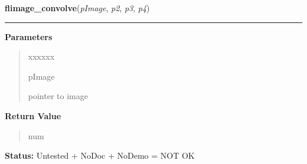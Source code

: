     \label{xformslib:library:flimage_convolve}

    \vspace{0.5ex}

\hspace{.8\funcindent}\begin{boxedminipage}{\funcwidth}

    \raggedright \textbf{flimage\_convolve}(\textit{pImage}, \textit{p2}, \textit{p3}, \textit{p4})

    \vspace{-1.5ex}

    \rule{\textwidth}{0.5\fboxrule}
\setlength{\parskip}{2ex}
\setlength{\parskip}{1ex}
      \textbf{Parameters}
      \vspace{-1ex}

      \begin{quote}
        \begin{Ventry}{xxxxxx}

          \item[pImage]

          pointer to image

        \end{Ventry}

      \end{quote}

      \textbf{Return Value}
    \vspace{-1ex}

      \begin{quote}
      num

      \end{quote}

\textbf{Status:} Untested + NoDoc + NoDemo = NOT OK



    \end{boxedminipage}

    \label{xformslib:library:flimage_convolvea}

    \vspace{0.5ex}

